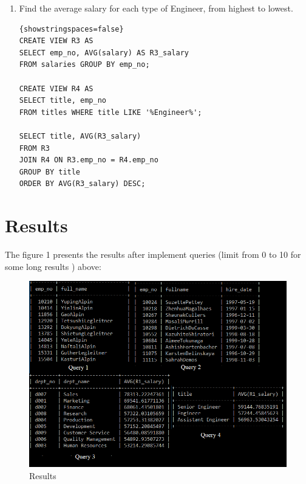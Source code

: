 \documentclass{article}
\begin{document}
\begin{enumerate}
	\item Find the average salary for each type of Engineer, from highest to lowest.
	\begin{lstlisting}{showstringspaces=false}	
CREATE VIEW R3 AS
SELECT emp_no, AVG(salary) AS R3_salary 
FROM salaries GROUP BY emp_no; 

CREATE VIEW R4 AS
SELECT title, emp_no 
FROM titles WHERE title LIKE '%Engineer%';

SELECT title, AVG(R3_salary)
FROM R3
JOIN R4 ON R3.emp_no = R4.emp_no
GROUP BY title
ORDER BY AVG(R3_salary) DESC;
	\end{lstlisting}
		
\end{enumerate}

\section*{Results}

The figure 1 presents the results after implement queries (limit from 0 to 10 for some long results
) above:\\
\begin{figure}
\includegraphics[scale = 0.8]{result.PNG}
\caption{Results}
\end{figure}
\end{document}
